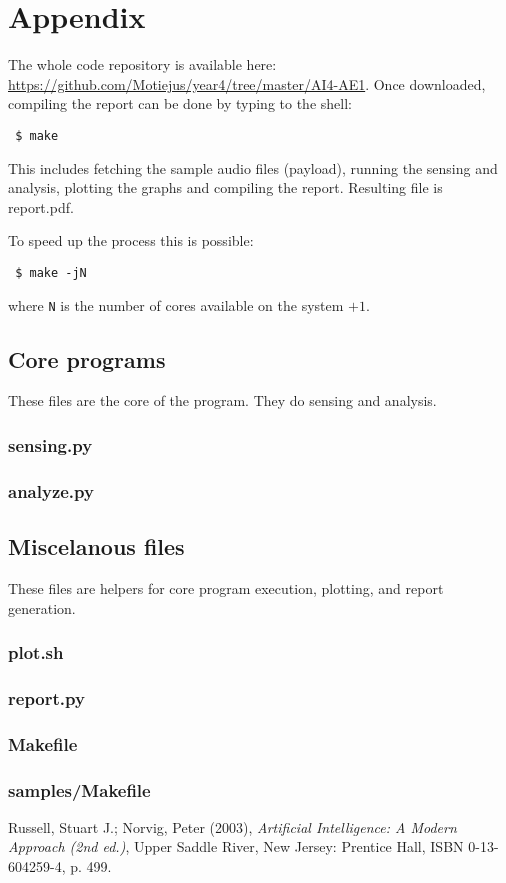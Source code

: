 \documentclass[english,11pt]{article}
\numberwithin{equation}{section}
\newcommand{\listing}[1]{
    \subsubsection{#1}
    {\small }
}
\begin{document}
\section{Appendix}

The whole code repository is available here:
\url{https://github.com/Motiejus/year4/tree/master/AI4-AE1}. Once downloaded,
compiling the report can be done by typing to the shell:

\texttt {
   \$ make
}

This includes fetching the sample audio files (payload), running the sensing
and analysis, plotting the graphs and compiling the report. Resulting file is
report.pdf.

To speed up the process this is possible:

\texttt {
    \$ make -jN
}

where \texttt{N} is the number of cores available on the system $+1$.

\subsection{Core programs}
These files are the core of the program. They do sensing and analysis.

\listing{sensing.py}
\listing{analyze.py}

\subsection{Miscelanous files}

These files are helpers for core program execution, plotting, and report
generation.

\listing{plot.sh}
\listing{report.py}
\listing{Makefile}
\listing{samples/Makefile}

\clearpage
\begin{thebibliography}{9}

        Russell, Stuart J.; Norvig, Peter (2003),
        \emph{Artificial Intelligence: A Modern Approach (2nd ed.)},
        Upper Saddle River, New Jersey: Prentice Hall,
        ISBN 0-13-604259-4, p. 499.

\end{thebibliography}
\end{document}
